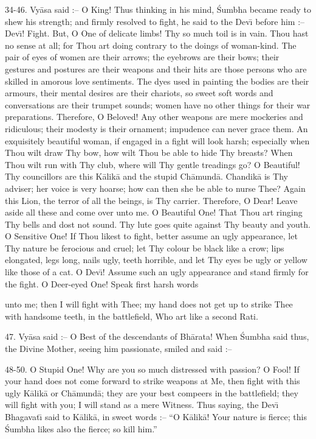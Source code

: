 34-46. Vy\=asa said :-- O King! Thus thinking in his mind, \'Sumbha became ready to shew his strength; and firmly resolved to fight, he said to the Dev\={\i} before him :-- Dev\={\i}! Fight. But, O One of delicate limbs! Thy so much toil is in vain. Thou hast no sense at all; for Thou art doing contrary to the doings of woman-kind. The pair of eyes of women are their arrows; the eyebrows are their bows; their gestures and postures are their weapons and their hits are those persons who are skilled in amorous love sentiments. The dyes used in painting the bodies are their armours, their mental desires are their chariots, so sweet soft words and conversations are their trumpet sounds; women have no other things for their war preparations. Therefore, O Beloved! Any other weapons are mere mockeries and ridiculous; their modesty is their ornament; impudence can never grace them. An exquisitely beautiful woman, if engaged in a fight will look harsh; especially when Thou wilt draw Thy bow, how wilt Thou be able to hide Thy breasts? When Thou wilt run with Thy club, where will Thy gentle treadings go? O Beautiful! Thy councillors are this K\=alik\=a and the stupid Ch\=amund\=a. Chandik\=a is Thy adviser; her voice is very hoarse; how can then she be able to nurse Thee? Again this Lion, the terror of all the beings, is Thy carrier. Therefore, O Dear! Leave aside all these and come over unto me. O Beautiful One! That Thou art ringing Thy bells and dost not sound. Thy lute goes quite against Thy beauty and youth. O Sensitive One! If Thou likest to fight, better assume an ugly appearance, let Thy nature be ferocious and cruel; let Thy colour be black like a crow; lips elongated, legs long, nails ugly, teeth horrible, and let Thy eyes be ugly or yellow like those of a cat. O Dev\={\i}! Assume such an ugly appearance and stand firmly for the fight. O Deer-eyed One! Speak first harsh words

unto me; then I will fight with Thee; my hand does not get up to strike Thee with handsome teeth, in the battlefield, Who art like a second Rati.

47. Vy\=asa said :-- O Best of the descendants of Bh\=arata! When \'Sumbha said thus, the Divine Mother, seeing him passionate, smiled and said :--

48-50. O Stupid One! Why are you so much distressed with passion? O Fool! If your hand does not come forward to strike weapons at Me, then fight with this ugly K\=alik\=a or Ch\=amund\=a; they are your best compeers in the battlefield; they will fight with you; I will stand as a mere Witness. Thus saying, the Dev\={\i} Bhagavat\={\i} said to K\=alik\=a, in sweet words :-- ``O K\=alik\=a! Your nature is fierce; this \'Sumbha likes also the fierce; so kill him.''

